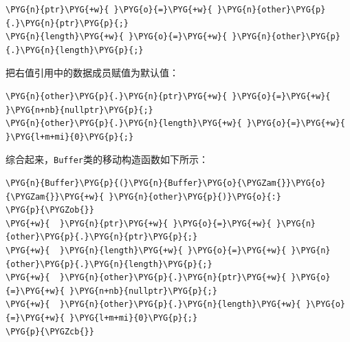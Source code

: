 
\begin{codeblockbg}
\begin{Verbatim}[commandchars=\\\{\},breaklines=true,breakanywhere=true,fontsize=\codefont,xleftmargin=17bp]
\PYG{n}{ptr}\PYG{+w}{ }\PYG{o}{=}\PYG{+w}{ }\PYG{n}{other}\PYG{p}{.}\PYG{n}{ptr}\PYG{p}{;}
\PYG{n}{length}\PYG{+w}{ }\PYG{o}{=}\PYG{+w}{ }\PYG{n}{other}\PYG{p}{.}\PYG{n}{length}\PYG{p}{;}
\end{Verbatim}
\end{codeblockbg}



把右值引用中的数据成员赋值为默认值：



\begin{codeblockbg}
\begin{Verbatim}[commandchars=\\\{\},breaklines=true,breakanywhere=true,fontsize=\codefont,xleftmargin=17bp]
\PYG{n}{other}\PYG{p}{.}\PYG{n}{ptr}\PYG{+w}{ }\PYG{o}{=}\PYG{+w}{ }\PYG{n+nb}{nullptr}\PYG{p}{;}
\PYG{n}{other}\PYG{p}{.}\PYG{n}{length}\PYG{+w}{ }\PYG{o}{=}\PYG{+w}{ }\PYG{l+m+mi}{0}\PYG{p}{;}
\end{Verbatim}
\end{codeblockbg}



综合起来，\texttt{Buffer}类的移动构造函数如下所示：



\begin{codeblockbg}
\begin{Verbatim}[commandchars=\\\{\},breaklines=true,breakanywhere=true,fontsize=\codefont,xleftmargin=17bp]
\PYG{n}{Buffer}\PYG{p}{(}\PYG{n}{Buffer}\PYG{o}{\PYGZam{}}\PYG{o}{\PYGZam{}}\PYG{+w}{ }\PYG{n}{other}\PYG{p}{)}\PYG{o}{:}
\PYG{p}{\PYGZob{}}
\PYG{+w}{  }\PYG{n}{ptr}\PYG{+w}{ }\PYG{o}{=}\PYG{+w}{ }\PYG{n}{other}\PYG{p}{.}\PYG{n}{ptr}\PYG{p}{;}
\PYG{+w}{  }\PYG{n}{length}\PYG{+w}{ }\PYG{o}{=}\PYG{+w}{ }\PYG{n}{other}\PYG{p}{.}\PYG{n}{length}\PYG{p}{;}
\PYG{+w}{  }\PYG{n}{other}\PYG{p}{.}\PYG{n}{ptr}\PYG{+w}{ }\PYG{o}{=}\PYG{+w}{ }\PYG{n+nb}{nullptr}\PYG{p}{;}
\PYG{+w}{  }\PYG{n}{other}\PYG{p}{.}\PYG{n}{length}\PYG{+w}{ }\PYG{o}{=}\PYG{+w}{ }\PYG{l+m+mi}{0}\PYG{p}{;}
\PYG{p}{\PYGZcb{}}
\end{Verbatim}
\end{codeblockbg}


